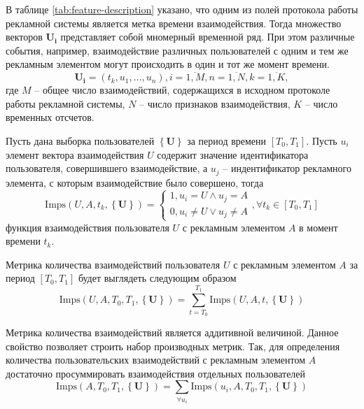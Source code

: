 В таблице \ref{tab:feature-description} указано, что одним из полей протокола работы рекламной системы является метка
времени взаимодействия. Тогда множество векторов $\mathbf{U_i}$ представляет собой мномерный временной ряд. При этом 
различные события, например, взаимодействие различных пользователей с одним и тем же рекламным элементом могут
происходить в один и тот же момент времени.
\begin{equation}
    \mathbf{U_i} = \left(t_k, u_1, \dots, u_n \right), i = \overline{1, M}, n = \overline{1, N}, k = \overline{1, K},
\end{equation}
где $M$ -- общее число взаимодействий, содержащихся в исходном протоколе работы рекламной системы, $N$ -- число признаков
взаимодействия, $K$ -- число временных отсчетов.

Пусть дана выборка пользователей $\left\{ \mathbf{U} \right\}$ за период времени $\left[T_0, T_1\right]$. Пусть $u_i$
элемент вектора взаимодействия $U$ содержит значение идентификатора пользователя, совершившего взаимодействие, а $u_j$ -- 
индентификатор рекламного элемента, с которым взаимодействие было совершено, тогда
\begin{equation}
    \text{Imps} \left( U, A, t_k, \left\{ \mathbf{U} \right\} \right) =
        \begin{cases}
            1, u_i = U \wedge u_j = A  \\
            0, u_i \neq U \vee u_j \neq A
        \end{cases}, \forall t_k \in \left[T_0, T_1\right]
\end{equation}
функция взаимодействия пользователя $U$ с рекламным элементом $A$ в момент времени $t_k$. 

Метрика количества взаимодействий пользователя $U$ с рекламным элементом $A$ за период $\left[T_0, T_1\right]$ 
будет выглядеть следующим образом
\begin{equation}
    \text{Imps} \left( U, A, T_0, T_1, \left\{ \mathbf{U} \right\} \right) =
    \sum \limits_{t=T_0}^{T_1} \text{Imps} \left( U, A, t, \left\{ \mathbf{U} \right\} \right) 
\end{equation}

Метрика количества взаимодействий является аддитивной величиной. Данное свойство позволяет строить набор производных
метрик. Так, для определения количества пользовательских взаимодействий с рекламным элементом $A$ достаточно просуммировать 
взаимодействия отдельных пользователей
\begin{equation}
    \text{Imps} \left(A, T_0, T_1, \left\{ \mathbf{U} \right\} \right) =
    \sum \limits_{\forall u_i} \text{Imps} \left( u_i, A, T_0, T_1, \left\{ \mathbf{U} \right\} \right)
\end{equation}

